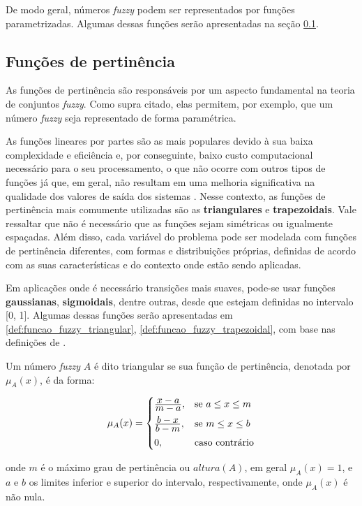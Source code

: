 De modo geral, números \emph{fuzzy} podem ser representados por funções parametrizadas. Algumas dessas funções serão apresentadas na seção \ref{sec:funcoes_pertinencia}.

\subsection{Funções de pertinência}
\label{sec:funcoes_pertinencia}
As funções de pertinência são responsáveis por um aspecto fundamental na teoria de conjuntos \emph{fuzzy}. Como supra citado, elas permitem, por exemplo, que um número \emph{fuzzy} seja representado de forma paramétrica.

As funções lineares por partes são as mais populares devido à sua baixa complexidade e eficiência e, por conseguinte, baixo custo computacional necessário para o seu processamento, o que não ocorre com outros tipos de funções já que, em geral, não resultam em uma melhoria significativa na qualidade dos valores de saída dos sistemas \citep{yen:99}. Nesse contexto, as funções de pertinência mais comumente utilizadas são as \textbf{triangulares} e \textbf{trapezoidais}. Vale ressaltar que não é necessário que as funções sejam simétricas ou igualmente  espaçadas. Além disso, cada variável do problema pode ser modelada com funções de pertinência diferentes,  com  formas  e  distribuições  próprias, definidas  de  acordo com  as suas características e do contexto onde estão sendo aplicadas.

Em aplicações onde é necessário transições mais suaves, pode-se usar funções \textbf{gaussianas}, \textbf{sigmoidais}, dentre outras, desde que estejam definidas no intervalo [0, 1]. Algumas dessas funções serão apresentadas em \ref{def:funcao_fuzzy_triangular}, \ref{def:funcao_fuzzy_trapezoidal}, com base nas definições de \citet{sumathi:10}.

\begin{defn}
\label{def:funcao_fuzzy_triangular}
Um número \emph{fuzzy} $A$ é dito triangular se sua função de pertinência, denotada por $\mu_{A}(x)$, é da forma:

\begin{equation}
  \mu_A(x) =  \begin{cases}
                \frac{\displaystyle x - a}{\displaystyle m - a}, & \text{se}\ a \leq x \leq m\\[0.5em]
                \frac{\displaystyle b - x}{\displaystyle b - m}, & \text{se}\ m \leq x \leq b\\[0.5em]
                0, & \text{caso contrário}
              \end{cases}
\end{equation}
\end{defn}
\noindent onde $m$ é o máximo grau de pertinência ou $altura(A)$, em geral $\mu_A(x) = 1$, e $a$ e $b$ os limites inferior e superior do intervalo, respectivamente, onde $\mu_A(x)$ é não nula.

